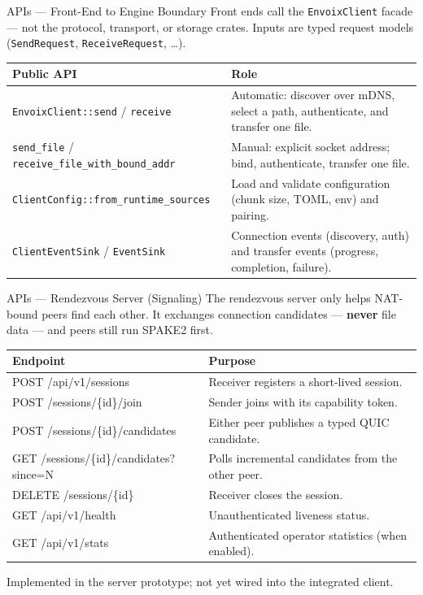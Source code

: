 \documentclass[xcolor=table,dvipsnames,svgnames,aspectratio=169]{beamer}
\begin{document}
\begin{frame}{APIs --- Front-End to Engine Boundary}
\small
Front ends call the \texttt{EnvoixClient} facade --- not the protocol, transport, or storage crates. Inputs are typed request models (\texttt{SendRequest}, \texttt{ReceiveRequest}, \dots).

\vspace{0.8em}
\renewcommand{\arraystretch}{1.35}
\begin{tabularx}{\textwidth}{@{}>{\raggedright\arraybackslash}p{}X@{}}
\toprule
\textbf{Public API} & \textbf{Role} \\
\midrule
\texttt{EnvoixClient::send} / \texttt{receive} & Automatic: discover over mDNS, select a path, authenticate, and transfer one file. \\
\texttt{send\_file} / \texttt{receive\_file\_with\_bound\_addr} & Manual: explicit socket address; bind, authenticate, transfer one file. \\
\texttt{ClientConfig::from\_runtime\_sources} & Load and validate configuration (chunk size, TOML, env) and pairing. \\
\texttt{ClientEventSink} / \texttt{EventSink} & Connection events (discovery, auth) and transfer events (progress, completion, failure). \\
\bottomrule
\end{tabularx}
\end{frame}

\begin{frame}{APIs --- Rendezvous Server (Signaling)}
\footnotesize
The rendezvous server only helps NAT-bound peers find each other. It exchanges connection candidates --- \textbf{never} file data --- and peers still run SPAKE2 first.

\vspace{0.5em}
\renewcommand{\arraystretch}{1.25}
\begin{tabularx}{\textwidth}{@{}>{\ttfamily\raggedright\arraybackslash}p{}X@{}}
\toprule
\normalfont\textbf{Endpoint} & \textbf{Purpose} \\
\midrule
POST /api/v1/sessions & Receiver registers a short-lived session. \\
POST /sessions/\{id\}/join & Sender joins with its capability token. \\
POST /sessions/\{id\}/candidates & Either peer publishes a typed QUIC candidate. \\
GET /sessions/\{id\}/candidates?since=N & Polls incremental candidates from the other peer. \\
DELETE /sessions/\{id\} & Receiver closes the session. \\
GET /api/v1/health & Unauthenticated liveness status. \\
GET /api/v1/stats & Authenticated operator statistics (when enabled). \\
\bottomrule
\end{tabularx}

\vspace{0.4em}
{\footnotesize Implemented in the server prototype; not yet wired into the integrated client.}
\end{frame}
\end{document}
